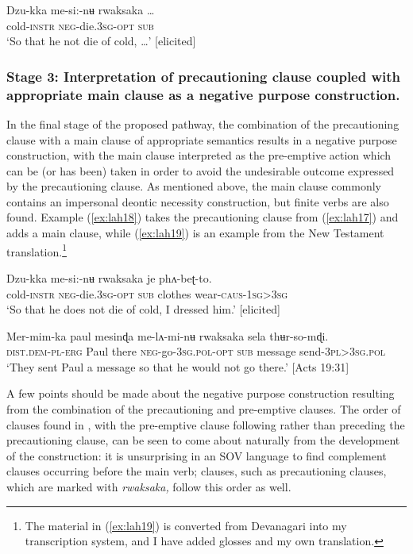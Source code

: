 \documentclass[output=paper,colorlinks,citecolor=brown]{langscibook}
\begin{document}
\ea \label{ex:lah17}
\gll Dzu-kka me-si:-nʉ rwaksaka \ldots \\
cold-\textsc{instr} \textsc{neg}-die.\textsc{3sg-opt} \textsc{sub} \\
\glt `So that he not die of cold, \ldots' [elicited]
\z

\subsubsection{Stage 3: Interpretation of precautioning clause coupled with appropriate main clause as a negative purpose construction.}
\label{subsubsec:stage3}

In the final stage of the proposed pathway, the combination of the precautioning clause with a main clause of appropriate semantics results in a negative purpose construction, with the main clause interpreted as the pre-emptive action which can be (or has been) taken in order to avoid the undesirable outcome expressed by the precautioning clause. As mentioned above, the main clause commonly contains an impersonal deontic necessity construction, but finite verbs are also found. Example (\ref{ex:lah18}) takes the precautioning clause from (\ref{ex:lah17}) and adds a main clause, while (\ref{ex:lah19}) is an example from the New Testament translation.\footnote{The material in (\ref{ex:lah19}) is converted from Devanagari into my transcription system, and I have added glosses and my own translation.}


\ea \label{ex:lah18}
\gll Dzu-kka me-si:-nʉ rwaksaka je phʌ-beʈ-to. \\
cold-\textsc{instr} \textsc{neg}-die.\textsc{3sg-opt} \textsc{sub} clothes wear-\textsc{caus-1sg>3sg} \\
\glt `So that he does not die of cold, I dressed him.' [elicited]
\z

   
\ea \label{ex:lah19}
\gll Mer-mim-ka paul mesinɖa me-lʌ-mi-nʉ rwaksaka sela  thʉr-so-mɖi. \\
\textsc{dist.dem-pl-erg} Paul there \textsc{neg-}go-\textsc{3sg.pol-opt} \textsc{sub} message send\textsc{-3pl>3sg.pol} \\
\glt `They sent Paul a message so that he would not go there.' [Acts 19:31]
\z

A few points should be made about the negative purpose construction resulting from the combination of the precautioning and pre-emptive clauses. The order of clauses found in , with the pre-emptive clause following rather than preceding the precautioning clause, can be seen to come about naturally from the development of the construction: it is unsurprising in an SOV language to find complement clauses occurring before the main verb; clauses, such as precautioning clauses, which are marked with \textit{rwaksaka,} follow this order as well.
\end{document}
